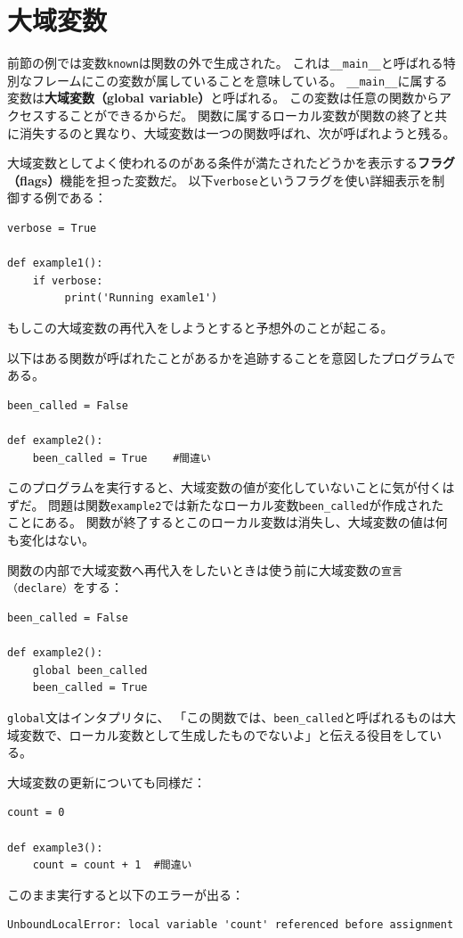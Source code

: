 \documentclass[a4j,12pt,makeidx]{jbook}
\begin{document}
\section{大域変数}
前節の例では変数{\tt known}は関数の外で生成された。
これは{\verb"__main__"}と呼ばれる特別なフレームにこの変数が属していることを意味している。
{\verb"__main__"}に属する変数は{\bf 大域変数（global variable）}と呼ばれる。
この変数は任意の関数からアクセスすることができるからだ。
関数に属するローカル変数が関数の終了と共に消失するのと異なり、大域変数は一つの関数呼ばれ、次が呼ばれようと残る。\par
大域変数としてよく使われるのがある条件が満たされたどうかを表示する{\bf フラグ（flags）}機能を担った変数だ。
以下{\tt verbose}というフラグを使い詳細表示を制御する例である：
\begin{verbatim}
verbose = True

def example1():
    if verbose:
         print('Running examle1')
\end{verbatim}
もしこの大域変数の再代入をしようとすると予想外のことが起こる。\par
以下はある関数が呼ばれたことがあるかを追跡することを意図したプログラムである。
\begin{verbatim}
been_called = False

def example2():
    been_called = True    #間違い
\end{verbatim}
このプログラムを実行すると、大域変数の値が変化していないことに気が付くはずだ。
問題は関数{\tt example2}では新たなローカル変数{\tt been\_called}が作成されたことにある。
関数が終了するとこのローカル変数は消失し、大域変数の値は何も変化はない。 \par
関数の内部で大域変数へ再代入をしたいときは使う前に大域変数の{\tt 宣言（declare）}をする：
\begin{verbatim}
been_called = False

def example2():
    global been_called
    been_called = True  
\end{verbatim} 
{\tt global}文はインタプリタに、
「この関数では、{\tt been\_called}と呼ばれるものは大域変数で、ローカル変数として生成したものでないよ」と伝える役目をしている。\par
大域変数の更新についても同様だ：
\begin{verbatim}
count = 0

def example3():
    count = count + 1  #間違い
\end{verbatim}
このまま実行すると以下のエラーが出る：
\begin{verbatim}
UnboundLocalError: local variable 'count' referenced before assignment
\end{verbatim}
\end{document}
